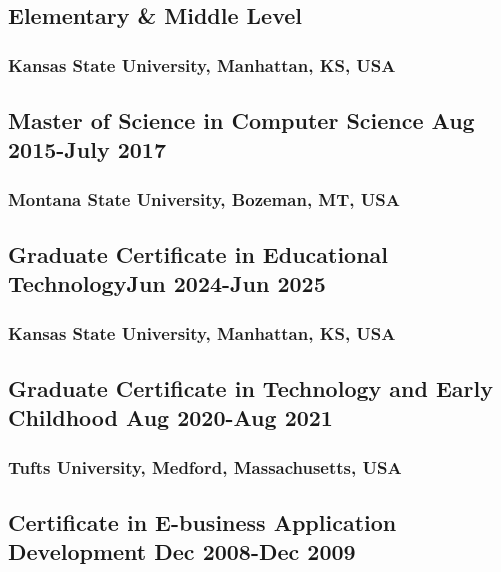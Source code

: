 \documentclass[11pt]{article}
\begin{document}
\subsection{Elementary \& Middle Level}  
\subsubsection{Kansas State University,  Manhattan, KS, USA}

\vspace{0.8em} %

\subsection{Master of Science in Computer Science  \hfill \normalfont Aug 2015-July 2017}  
\subsubsection{Montana State University,  Bozeman, MT, USA}
\vspace{0.8em} %

\subsection{Graduate Certificate in Educational Technology\hfill \normalfont Jun 2024-Jun 2025}  
\subsubsection{Kansas State University,  Manhattan, KS, USA}
\vspace{0.8em} %


\subsection{Graduate Certificate in Technology and Early Childhood  \hfill \normalfont Aug 2020-Aug 2021}  
\subsubsection{Tufts University, Medford, Massachusetts, USA}
\vspace{0.8em} %

\subsection{Certificate in E-business Application Development  \hfill \normalfont Dec 2008-Dec 2009}  
\end{document}
